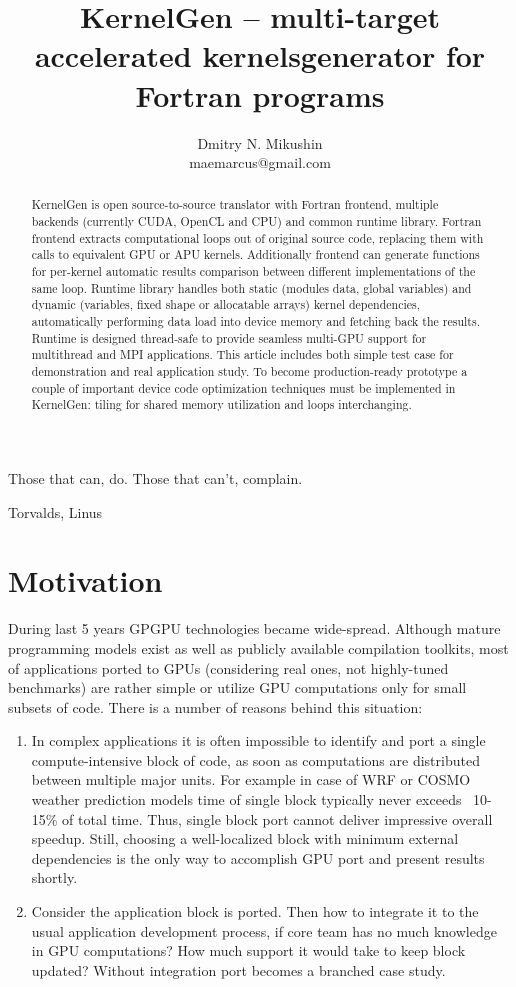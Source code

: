 \documentclass[a4,12pt]{article}
\title{KernelGen -- multi-target accelerated kernels\linebreak generator for Fortran programs}
\author{Dmitry N. Mikushin\\ maemarcus@gmail.com}
\begin{document}
\maketitle

\begin{abstract}

KernelGen is open source-to-source translator with Fortran frontend, multiple backends (currently CUDA, OpenCL and CPU) and common runtime library. Fortran frontend extracts computational loops out of original source code, replacing them with calls to equivalent GPU or APU kernels. Additionally frontend can generate functions for per-kernel automatic results comparison between different implementations of the same loop. Runtime library handles both static (modules data, global variables) and dynamic (variables, fixed shape or allocatable arrays) kernel dependencies, automatically performing data load into device memory and fetching back the results. Runtime is designed thread-safe to provide seamless multi-GPU support for multithread and MPI applications. This article includes both simple test case for demonstration and real application study. To become production-ready prototype a couple of important device code optimization techniques must be implemented in KernelGen: tiling for shared memory utilization and loops interchanging.

\end{abstract}

\pagebreak

\setlength{\epigraphwidth}{8cm}
\epigraph{Those that can, do. Those that can't, complain.}{Torvalds, Linus}

\section{Motivation}

During last 5 years GPGPU technologies became wide-spread. Although mature programming models exist as well as publicly available compilation toolkits, most of applications ported to GPUs (considering real ones, not highly-tuned benchmarks) are rather simple or utilize GPU computations only for small subsets of code. There is a number of reasons behind this situation:

\begin{enumerate}
\item In complex applications it is often impossible to identify and port a single compute-intensive block of code, as soon as computations are distributed between multiple major units. For example in case of WRF or COSMO weather prediction models time of single block typically never exceeds ~10-15\% of total time. Thus, single block port cannot deliver impressive overall speedup. Still, choosing a well-localized block with minimum external dependencies is the only way to accomplish GPU port and present results shortly.
\item Consider the application block is ported. Then how to integrate it to the usual application development process, if core team has no much knowledge in GPU computations? How much support it would take to keep block updated? Without integration port becomes a branched case study.
\end{enumerate}
\end{document}
